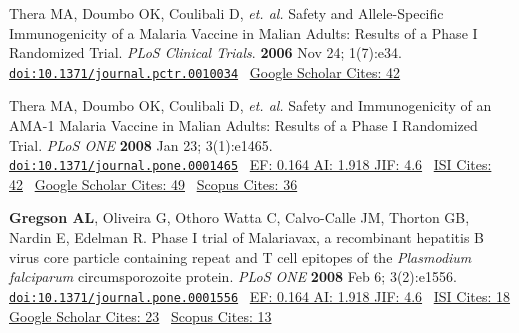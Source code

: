 \documentclass[12pt]{moderncv} %
\begin{document}
\begin{thebibliography}{1}
 \bibitem[3]{} Thera MA, Doumbo OK, Coulibali D, \emph{et. al.} Safety and Allele-Specific Immunogenicity of a Malaria Vaccine in Malian Adults: Results of a Phase I Randomized Trial.  {\color{journalcolor}\textit{PLoS Clinical Trials}}.  \textbf{2006} Nov 24; 1(7):e34. \href{http://dx.doi.org/10.1371/journal.pctr.0010034}{\nolinkurl{doi:10.1371/journal.pctr.0010034}}~ 
   {\color{subsectioncolor}\href{http://scholar.google.com/scholar?cites=2534822405987072634&as_sdt=2005&sciodt=0,5&hl=en}{{\smaller Google Scholar Cites: 42}}
     }

 \bibitem[4]{} Thera MA, Doumbo OK, Coulibali D, \emph{et. al.} Safety and Immunogenicity of an AMA-1 Malaria Vaccine in Malian Adults: Results of a Phase I Randomized Trial. {\color{journalcolor}\textit{PLoS {\smaller ONE}}} \textbf{2008} Jan 23; 3(1):e1465. \href{http://dx.doi.org/10.1371/journal.pone.0001465}{\nolinkurl{doi:10.1371/journal.pone.0001465}}~ 
   {\color{subsectioncolor}\href{http://admin-apps.isiknowledge.com/JCR/JCR?RQ=RECORD&rank=6&journal=PLOS+ONE}{{\smaller EF: 0.164 AI: 1.918 JIF: 4.6}}~ 
     \href{http://apps.webofknowledge.com/CitedFullRecord.do?product=WOS&colName=WOS&SID=4AG6pnd7daKF6IABJdC&search_mode=CitedFullRecord&isickref=WOS:000260503900011}{{\smaller ISI Cites: 42}}~ 
     \href{http://scholar.google.com/scholar?cites=15540812245970669613&as_sdt=2005&sciodt=0,5&hl=en}{{\smaller Google Scholar Cites: 49}}~
     \href{http://www.scopus.com/record/display.url?eid=2-s2.0-44849126049&origin=inward&txGid=2728424DD3A06399B3857C04F09A7B4B.N5T5nM1aaTEF8rE6yKCR3A%3a31}{{\smaller Scopus Cites: 36}}
     }

 \bibitem[5]{} \textbf{Gregson AL}, Oliveira G, Othoro Watta C, Calvo-Calle JM, Thorton GB, Nardin E, Edelman R. Phase I trial of Malariavax, a recombinant hepatitis B virus core particle containing repeat and T cell epitopes of the \emph{Plasmodium falciparum} circumsporozoite protein. {\color{journalcolor}\textit{PLoS {\smaller ONE}}}  \textbf{2008} Feb 6; 3(2):e1556.  \href{http://www.plosone.org/doi/pone.0001556}{\nolinkurl{doi:10.1371/journal.pone.0001556}}~ 
   {\color{subsectioncolor} \href{http://admin-apps.isiknowledge.com/JCR/JCR?RQ=RECORD&rank=6&journal=PLOS+ONE}{{\smaller EF: 0.164 AI: 1.918  JIF: 4.6}}~  
       \href{http://apps.webofknowledge.com/CitedFullRecord.do?product=WOS&colName=WOS&SID=3BKgP7NlJAN3im2FBbd&search_mode=CitedFullRecord&isickref=WOS:000260535700027&cacheurlFromRightClick=no}{{\smaller ISI Cites: 18}}
       \href{http://scholar.google.com/scholar?cites=3128529885204548330&as_sdt=2005&sciodt=0,5&hl=en}{{\smaller Google Scholar Cites: 23}}~
       \href{http://www.scopus.com/record/display.url?eid=2-s2.0-45249093689&origin=inward&txGid=2728424DD3A06399B3857C04F09A7B4B.N5T5nM1aaTEF8rE6yKCR3A%3a29}{{\smaller Scopus Cites: 13}}
     }


\end{thebibliography}
\end{document}
